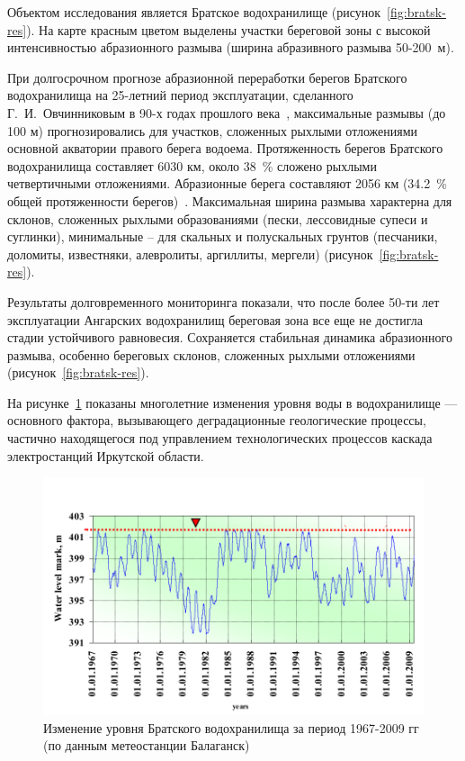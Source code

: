 \documentclass[732,fontsize=14pt,final]{studrep}
\begin{document}
Объектом исследования является Братское водохранилище (рисунок~\ref{fig:bratsk-res}). На карте красным цветом выделены участки береговой зоны с высокой интенсивностью абразионного размыва (ширина абразивного размыва 50-200~м).

При долгосрочном прогнозе абразионной переработки берегов Братского водохранилища на 25-летний период эксплуатации, сделанного Г.~И.~Овчинниковым в 90-х годах прошлого века~\cite{ovch99}, максимальные размывы (до 100 м) прогнозировались для участков, сложенных рыхлыми отложениями основной акватории правого берега водоема.
Протяженность берегов Братского водохранилища составляет 6030 км, около 38~\% сложено рыхлыми четвертичными отложениями. Абразионные берега составляют 2056 км (34.2~\% общей протяженности берегов)~\cite{ovch03}. Максимальная ширина размыва характерна для склонов, сложенных рыхлыми образованиями (пески, лессовидные супеси и суглинки), минимальные – для скальных и полускальных грунтов (песчаники, доломиты, известняки, алевролиты, аргиллиты, мергели) (рисунок~\ref{fig:bratsk-res}).

Результаты долговременного мониторинга показали, что после более 50-ти лет эксплуатации Ангарских водохранилищ береговая зона все еще не достигла стадии устойчивого равновесия.  Сохраняется стабильная динамика абразионного размыва, особенно береговых склонов, сложенных рыхлыми отложениями (рисунок~\ref{fig:bratsk-res}).


На рисунке~\ref{fig:water-level} показаны многолетние изменения уровня воды в  водохранилище — основного фактора, вызывающего деградационные геологические процессы, частично находящегося под управлением технологических процессов каскада электростанций Иркутской области.

  \begin{figure}[htp]
	\centering
    \includegraphics[width=\linewidth]{pics/image17.png}
    \caption{Изменение уровня Братского водохранилища за период 1967-2009 гг (по данным метеостанции Балаганск)}
    \label{fig:water-level}
  \end{figure}
\end{document}
